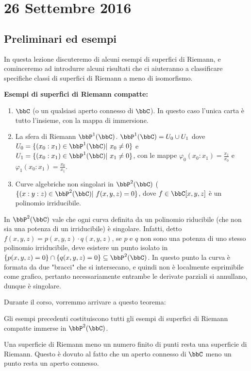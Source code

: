 \chapter{26 Settembre 2016} %

\section{Preliminari ed esempi}
In questa lezione discuteremo di alcuni esempi di superfici di Riemann, e cominceremo ad introdurre alcuni risultati che ci aiuteranno a classificare specifiche classi di superfici di Riemann a meno di isomorfismo.



\textbf{Esempi di superfici di Riemann compatte:}
\begin{enumerate}
  \item $\bbC$ (o un qualsiasi aperto connesso di $\bbC$). In questo caso l'unica carta è tutto l'insieme, con la mappa di immersione.
  \item La sfera di Riemann $\bbP^1(\bbC)$. $\bbP^1(\bbC)=U_0\cup U_1$ dove $U_0=\{(x_0:x_1)\in \bbP^1(\bbC) | \ x_0\neq 0\}$ e $U_1=\{(x_0:x_1)\in \bbP^1(\bbC) | \ x_1\neq 0\}$, con le mappe $\varphi_0(x_0:x_1)=\frac{x_1}{x_0}$ e $\varphi_1(x_0:x_1)=\frac{x_0}{x_1}$.
  \item Curve algebriche non singolari in $\bbP^2(\bbC)$ ($\{(x:y:z)\in \bbP^2(\bbC) | \ f(x,y,z)=0\}$, dove $f\in \bbC[x,y,z]$ è un polinomio irriducibile. %
\end{enumerate}
\begin{osservazione}
    In $\bbP^2(\bbC)$ vale che ogni curva definita da un polinomio riducibile (che non sia una potenza di un irriducibile) è singolare. Infatti, detto $f(x,y,z)=p(x,y,z)\cdot q(x,y,z)$, se $p$ e $q$ non sono una potenza di uno stesso polinomio irriducibile, deve esistere un punto isolato in $\{p(x,y,z)=0\}\cap\{q(x,y,z)=0\}\subseteq \bbP^2(\bbC)$. In questo punto la curva è formata da due "bracci" che si intersecano, e quindi non è localmente esprimibile come grafico, pertanto necessariamente entrambe le derivate parziali si annullano, dunque è singolare. %
\end{osservazione}
Durante il corso, vorremmo arrivare a questo teorema:
\begin{teorema}[di Chow]
    Gli esempi precedenti costituiscono tutti gli esempi di superfici di Riemann compatte immerse in $\bbP^2(\bbC)$.
\end{teorema}
\begin{osservazione}
    Una superficie di Riemann meno un numero finito di punti resta una superficie di Riemann. Questo è dovuto al fatto che un aperto connesso di $\bbC$ meno un punto resta un aperto connesso.
\end{osservazione}


